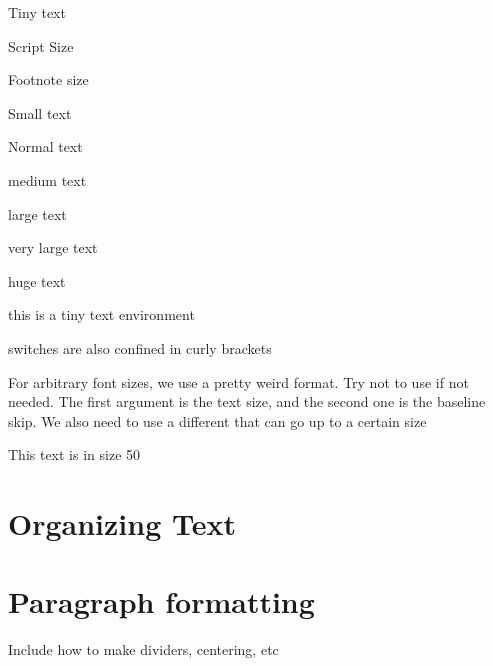 \documentclass[12pt]{report}
\begin{document}
\tiny Tiny text 

\scriptsize Script Size 

\footnotesize Footnote size 

\small Small text 

\normalsize Normal text 

\large medium text 

\Large large text 

\LARGE very large text 

\huge huge text


\normalsize 

\begin{tiny}
this is a tiny text environment 
\end{tiny}

{\huge switches are also confined in curly brackets}

For arbitrary font sizes, we use a pretty weird format. Try not to use if not needed. The first argument is the text size, and the second one is the baseline skip. We also need to use a different that can go up to a certain size 

{\fontsize{50}{55}\selectfont {}\selectfont This text is in size 50}

\chapter{Organizing Text}

\chapter{Paragraph formatting}

Include how to make dividers, centering, etc
\end{document}
